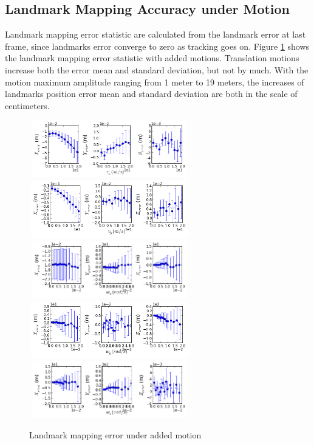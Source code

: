\subsection{Landmark Mapping Accuracy under Motion}\label{sec:landmarkMotion}
Landmark mapping error statistic are calculated from the landmark error at last frame, since landmarks error converge to zero as tracking goes on. Figure \ref{fig:simfig20-24} shows the landmark mapping error statistic with added motions. Translation motions increase both the error mean and standard deviation, but not by much. With the motion maximum amplitude ranging from 1 meter to 19 meters, the increases of landmarks position error mean and standard deviation are both in the scale of centimeters.

\begin{figure}[h]
  \centering
  \includegraphics[width=7cm, height=2.5cm]{./Figures/SimulationFigures/Figure20.png}
  \includegraphics[width=7cm, height=2.5cm]{./Figures/SimulationFigures/Figure21.png}
  \includegraphics[width=7cm, height=2.5cm]{./Figures/SimulationFigures/Figure22.png}
  \includegraphics[width=7cm, height=2.5cm]{./Figures/SimulationFigures/Figure23.png}
  \includegraphics[width=7cm, height=2.5cm]{./Figures/SimulationFigures/Figure24.png}
  \caption{Landmark mapping error under added motion}
  \label{fig:simfig20-24}
\end{figure}

